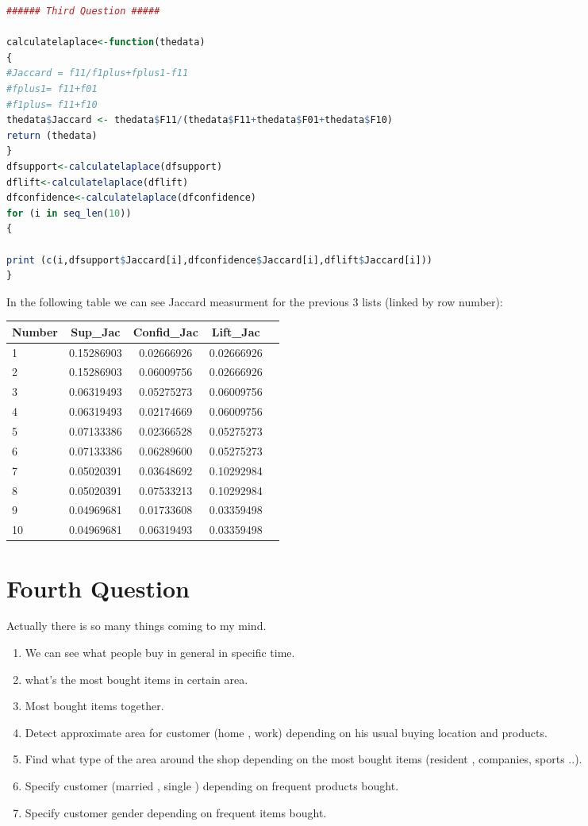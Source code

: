 \documentclass{article}
\begin{document}
\begin{lstlisting}[language=R]
###### Third Question #####

calculatelaplace<-function(thedata)
{
#Jaccard = f11/f1plus+fplus1-f11
#fplus1= f11+f01
#f1plus= f11+f10
thedata$Jaccard <- thedata$F11/(thedata$F11+thedata$F01+thedata$F10)
return (thedata)
}
dfsupport<-calculatelaplace(dfsupport)
dflift<-calculatelaplace(dflift)
dfconfidence<-calculatelaplace(dfconfidence)
for (i in seq_len(10))
{

print (c(i,dfsupport$Jaccard[i],dfconfidence$Jaccard[i],dflift$Jaccard[i]))
}
\end{lstlisting}
In the following table we can see Jaccard measurment for the previous 3 lists (linked by row number):\\
\begin{tabular}{|l|*{4}{c|}}\hline
Number&Sup\_Jac&Confid\_Jac&Lift\_Jac\\ \hline
1&0.15286903&0.02666926&0.02666926\\\hline
2&0.15286903&0.06009756&0.02666926\\\hline
3&0.06319493&0.05275273&0.06009756\\\hline
4&0.06319493&0.02174669&0.06009756\\\hline
5&0.07133386&0.02366528&0.05275273\\\hline
6&0.07133386&0.06289600&0.05275273\\\hline
7&0.05020391&0.03648692&0.10292984\\\hline
8&0.05020391&0.07533213&0.10292984\\\hline
9&0.04969681&0.01733608&0.03359498\\\hline
10&0.04969681&0.06319493&0.03359498\\ \hline
\end{tabular}
\section*{Fourth Question}
Actually there is so many things coming to my mind.
\begin{enumerate}
	\item We can see what people buy in general in specific time.
	\item what's the most bought items in certain area.
	\item Most bought items together.
	\item Detect approximate area for customer (home , work) depending on his usual buying location and products.
	\item Find what type of the area around the shop depending on the most bought items (resident , companies, sports ..).
	\item Specify customer (married , single ) depending on frequent products bought.
	\item Specify customer gender depending on frequent items bought.
\end{enumerate}
\end{document}
